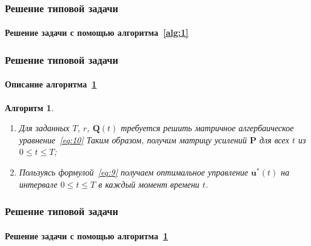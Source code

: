 \documentclass[ignorenonframetext,hyperref={pdftex,unicode},compress]{beamer}
\newtheorem{alg}{Алгоритм}
\begin{document}
\begin{frame}
	\frametitle{Решение типовой задачи}
	\framesubtitle{Решение задачи с помощью алгоритма~\ref{alg:1}}
    
    \begin{figure}\center
        
        \label{fig:alg1}
    \end{figure}
\end{frame}



\begin{frame}
	\frametitle{Решение типовой задачи}
	\framesubtitle{Описание алгоритма~\ref{alg:2}}
    
    \begin{alg}\label{alg:2}~
        \begin{enumerate}
            \item
                Для заданных $T$, $r$, $\mathbf{Q}(t)$ требуется решить матричное алгербаическое уравнение~\ref{eq:10} Таким образом, получим матрицу усилений $\mathbf{P}$ для всех $t$ из $0 \leqslant t \leqslant T$;

            \item
                Пользуясь формулой~\ref{eq:9} получаем оптимальное управление $\mathbf{u}^*(t)$ на интервале $0 \leqslant t \leqslant T$ в каждый момент времени $t$.
        \end{enumerate}
    \end{alg}
\end{frame}



\begin{frame}
	\frametitle{Решение типовой задачи}
	\framesubtitle{Решение задачи с помощью алгоритма~\ref{alg:2}}
    
    \begin{figure}\center
        
        \label{fig:alg2}
    \end{figure}
\end{frame}
\end{document}
